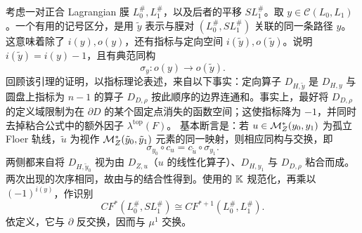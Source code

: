 考虑一对正合 Lagrangian 膜 $L_0^\#,\allowbreak L_1^\#$，以及后者的平移 $SL_1^\#$。取 $y\in\mathcal C(L_0,\allowbreak L_1)$。一个有用的记号区分，是用 $\tilde y$ 表示与膜对 $(L_0^\#,\allowbreak SL_1^\#)$ 关联的同一条路径 $y$。这意味着除了 $i(y),\allowbreak o(y)$，还有指标与定向空间 $i(\tilde y),\allowbreak o(\tilde y)$。说明 $i(\tilde y)=i(y)-1$，且有典范同构
\begin{equation}\label{eq:12.26}
\sigma_y:o(y)\longrightarrow o(\tilde y).
\end{equation}
回顾该引理的证明，以指标理论表述，来自以下事实：定向算子 $D_{H,\allowbreak \tilde y}$ 是 $D_{H,\allowbreak y}$ 与圆盘上指标为 $n-1$ 的算子 $D_{D,\allowbreak \rho}$ 按此顺序的边界连通和。事实上，最好将 $D_{D,\allowbreak \rho}$ 的定义域限制为在 $\partial D$ 的某个固定点消失的函数空间；这使指标降为 $-1$，并同时去掉粘合公式中的额外因子 $\lambda^{\mathrm{top}}(F)$。
基本断言是：若 $u\in\mathcal M_Z^*(y_0,\allowbreak y_1)$ 为孤立 Floer 轨线，$\tilde u$ 为视作 $\mathcal M_Z^*(\tilde y_0,\allowbreak \tilde y_1)$ 元素的同一映射，则相应同构与交换，即
\begin{equation}\label{eq:12.27}
\sigma_{y_0}\circ c_u=c_{\tilde u}\circ\sigma_{y_1}.
\end{equation}
两侧都来自将 $D_{H,\allowbreak \tilde y_0}$ 视为由 $D_{Z,\allowbreak u}$（$u$ 的线性化算子）、$D_{H,\allowbreak y_1}$ 与 $D_{D,\allowbreak \rho}$ 粘合而成。两次出现的次序相同，故由与的结合性得到。使用的 $\mathbb K$ 规范化，再乘以 $(-1)^{i(y)}$，作识别
\begin{equation}\label{eq:12.28}
CF^*(L_0^\#,SL_1^\#)\cong CF^{*+1}(L_0^\#,L_1^\#).
\end{equation}
依定义，它与 $\partial$ 反交换，因而与 $\mu^1$ 交换。

